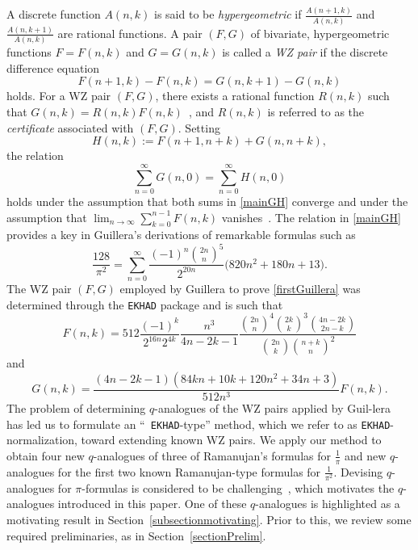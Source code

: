\documentclass[12pt]{article}
\begin{document}
 A discrete function $A(n ,k)$ is said to be \emph{hypergeometric} if $\frac{A(n+1, k)}{A(n, k)}$ and $\frac{A(n, k + 
 1)}{A(n, k)}$ are rational functions. A pair $(F, G)$ of bivariate, hypergeometric functions $F = F(n, k)$ and $G = G(n, k)$ is called a 
 \emph{WZ pair} if the discrete difference equation 
\begin{equation}\label{WZdifference}
 F(n+1, k) - F(n, k) = G(n, k + 1) - G(n, k) 
\end{equation}
 holds. For a WZ pair $(F, G)$, there exists a rational function $R(n ,k)$ such that $G(n, k) = R(n, k) F(n, k)$~\cite{WilfZeilberger1990}, 
 and $R(n, k)$ is referred to as the \emph{certificate} associated with $(F, G)$. Setting 
\begin{equation}\label{definitionH}
 H(n ,k) := F(n+1,n+k) + G(n,n+k), 
\end{equation}
 the relation 
\begin{equation}\label{mainGH}
 \sum_{n=0}^{\infty} G(n, 0) = \sum_{n=0}^{\infty} H(n, 0) 
\end{equation}
 holds under the assumption that both sums in \eqref{mainGH} converge and under the assumption that $\lim_{n \to \infty} \sum_{k 
 = 0}^{n - 1} F(n, k)$ vanishes~\cite{Zeilberger1993}. The relation in \eqref{mainGH} provides a key in Guillera's derivations of 
 remarkable formulas such as 
\begin{equation}\label{firstGuillera}
 \frac{128}{\pi ^2} = \sum_{n=0}^{\infty} \frac{ (-1)^{n} \binom{2n}{n}^{5} }{2^{20n}} 
 \big( 820 n^2 +180 n + 13 \big). 
\end{equation}
 The WZ pair $(F, G)$ employed by Guillera to prove \eqref{firstGuillera} was determined through the {\tt EKHAD} package and is 
 such that 
\begin{equation}\label{introGuilleraF}
 F(n, k) = 512 \frac{ (-1)^{k} }{ 2^{16n} 2^{4k} } \frac{n^3}{4n-2k-1} 
 \frac{ \binom{2n}{n}^{4} \binom{2k}{k}^{3} \binom{4n-2k}{2n-k} }{ \binom{2n}{k} \binom{n+k}{n}^{2} } 
\end{equation} 
 and $$ G(n, k) = \frac{(4 n - 2 k - 1) \left(84 k n+10 k+120 n^2+34 n+3\right)}{512 n^3} F(n, k). $$
 The problem of determining $q$-analogues of the WZ pairs applied by Guil-lera~\cite{Guillera2002} has led us to formulate an ``{\tt 
 EKHAD}-type'' method, which we refer to 
 as {\tt EKHAD}-normalization, 
 toward extending known WZ pairs. We apply our method
 to obtain four new $q$-analogues of three of Ramanujan's formulas for $\frac{1}{\pi}$
 and new $q$-analogues 
 for the first two known Ramanujan-type formulas 
 for $\frac{1}{\pi^2}$. 
 Devising $q$-analogues for $\pi$-formulas is 
 considered to be challenging~\cite{Wei2023}, which motivates the $q$-analogues
 introduced in this paper. 
 One of these $q$-analogues is highlighted as a motivating result in Section~\ref{subsectionmotivating}. Prior to this, we review some required preliminaries, as in Section~\ref{sectionPrelim}. 
\end{document}
